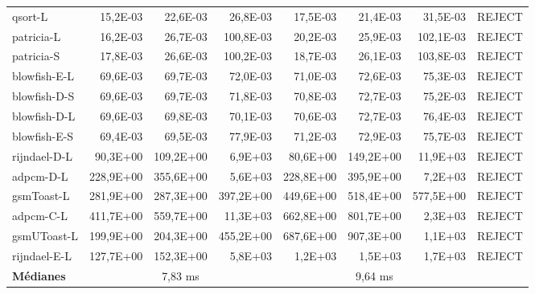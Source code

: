 \begin{table}[ht!]
\begin{adjustwidth}{-40pt}{0pt}
\begin{tabular}{@{}lrrrrrrl@{}}
			qsort-L             & 15,2E-03  & 22,6E-03  & 26,8E-03  & 17,5E-03  & 21,4E-03  & 31,5E-03  & REJECT   \\
			patricia-L          & 16,2E-03  & 26,7E-03  & 100,8E-03 & 20,2E-03  & 25,9E-03  & 102,1E-03 & REJECT   \\
			patricia-S          & 17,8E-03  & 26,6E-03  & 100,2E-03 & 18,7E-03  & 26,1E-03  & 103,8E-03 & REJECT   \\
			blowfish-E-L        & 69,6E-03  & 69,7E-03  & 72,0E-03  & 71,0E-03  & 72,6E-03  & 75,3E-03  & REJECT   \\
			blowfish-D-S        & 69,6E-03  & 69,7E-03  & 71,8E-03  & 70,8E-03  & 72,7E-03  & 75,2E-03  & REJECT   \\
			blowfish-D-L        & 69,6E-03  & 69,8E-03  & 70,1E-03  & 70,6E-03  & 72,7E-03  & 76,4E-03  & REJECT   \\
			blowfish-E-S        & 69,4E-03  & 69,5E-03  & 77,9E-03  & 71,2E-03  & 72,9E-03  & 75,7E-03  & REJECT   \\
			rijndael-D-L        & 90,3E+00  & 109,2E+00 & 6,9E+03   & 80,6E+00  & 149,2E+00 & 11,9E+03  & REJECT   \\
			adpcm-D-L           & 228,9E+00 & 355,6E+00 & 5,6E+03   & 228,8E+00 & 395,9E+00 & 7,2E+03   & REJECT   \\
			gsmToast-L          & 281,9E+00 & 287,3E+00 & 397,2E+00 & 449,6E+00 & 518,4E+00 & 577,5E+00 & REJECT   \\
			adpcm-C-L           & 411,7E+00 & 559,7E+00 & 11,3E+03  & 662,8E+00 & 801,7E+00 & 2,3E+03   & REJECT   \\
			gsmUToast-L         & 199,9E+00 & 204,3E+00 & 455,2E+00 & 687,6E+00 & 907,3E+00 & 1,1E+03   & REJECT   \\
			rijndael-E-L        & 127,7E+00 & 152,3E+00 & 5,8E+03   & 1,2E+03   & 1,5E+03   & 1,7E+03   & REJECT   \\
			\midrule
			\textbf{Médianes} 	& \multicolumn{3}{c}{7,83 ms}	& \multicolumn{3}{c}{9,64 ms}	& 	\\		
			\bottomrule
		\end{tabular}
	\end{adjustwidth}
\end{table}

\restoregeometry